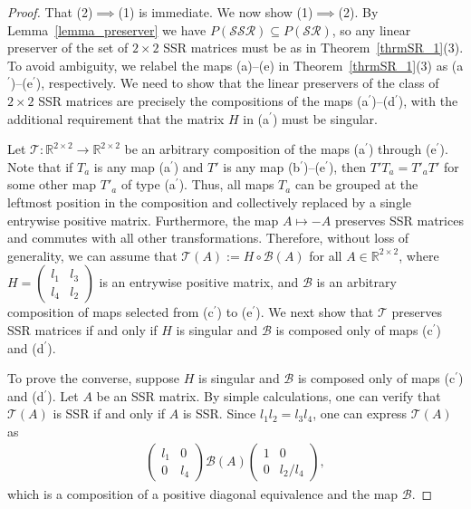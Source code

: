 \documentclass[11pt,reqno]{amsart}
\theoremstyle{plain}
\theoremstyle{definition}
\numberwithin{equation}{section}
\begin{document}
\begin{proof}
	That (2)$\implies$(1) is immediate. We now show (1)$\implies$(2). By Lemma~\ref{lemma_preserver} we have $P(\mathcal{SSR})\subseteq P(\mathcal{SR})$, so any linear preserver of the set of $2\times2$ SSR matrices must be as in Theorem~\ref{thrmSR_1}(3). To avoid ambiguity, we relabel the maps (a)--(e) in Theorem~\ref{thrmSR_1}(3) as (a$^{\prime}$)--(e$^{\prime}$), respectively. We need to show that the linear preservers of the class of $2\times2$ SSR matrices are precisely the compositions of the maps (a$^{\prime}$)--(d$^{\prime}$), with the additional requirement that the matrix $H$ in (a$^{\prime}$) must be singular.
	
    Let $\mathcal{T}:\mathbb{R}^{2\times2}\to\mathbb{R}^{2\times2}$ be an arbitrary composition of the maps (a$^{\prime}$) through (e$^{\prime}$). Note that if $T_a$ is any map (a$^{\prime}$) and $T'$ is any map (b$^{\prime}$)--(e$^{\prime}$), then $T' T_a = T'_a T'$ for some other map $T'_a$ of type (a$^{\prime}$). Thus, all maps $T_a$ can be grouped at the leftmost position in the composition and collectively replaced by a single entrywise positive matrix. Furthermore, the map $A\mapsto-A$ preserves SSR matrices and commutes with all other transformations. Therefore, without loss of generality, we can assume that $\mathcal{T}(A):=H\circ\mathcal{B}(A)$ for all $A\in\mathbb{R}^{2\times2}$, where $H=\begin{pmatrix}
		l_1 & l_3 \\
		l_4 & l_2
	\end{pmatrix}$ is an entrywise positive matrix, and $\mathcal{B}$ is an arbitrary composition of maps selected from (c$^{\prime}$) to (e$^{\prime}$). We next show that $\mathcal{T}$ preserves SSR matrices if and only if $H$ is singular and $\mathcal{B}$ is composed only of maps (c$^{\prime}$) and (d$^{\prime}$).
	
	To prove the converse, suppose $H$ is singular and $\mathcal{B}$ is composed only of maps (c$^{\prime}$) and (d$^{\prime}$). Let $A$ be an SSR matrix. By simple calculations, one can verify that $\mathcal{T}(A)$ is SSR if and only if $A$ is SSR. Since $l_1l_2=l_3l_4$, one can express $\mathcal{T}(A)$ as
	\begin{align*}
		\begin{pmatrix}
			l_1 & 0 \\
			0 & l_4
		\end{pmatrix}\mathcal{B}(A)\begin{pmatrix}
			1 & 0 \\
			0 & l_2/l_4
		\end{pmatrix},
	\end{align*}
	which is a composition of a positive diagonal equivalence and the map $\mathcal{B}$.
	

\end{proof}
\end{document}
